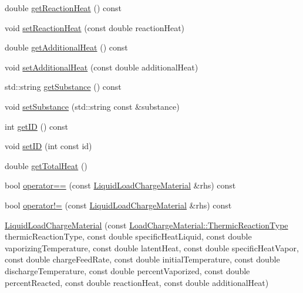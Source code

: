 \begin{DoxyCompactItemize}
\item 
double \hyperlink{class_liquid_load_charge_material_a2f0c26e789e98efd1e8fd0c8741ddd92}{get\+Reaction\+Heat} () const
\item 
void \hyperlink{class_liquid_load_charge_material_a793c7ebc2643b2af0eaf21b9cb788775}{set\+Reaction\+Heat} (const double reaction\+Heat)
\item 
double \hyperlink{class_liquid_load_charge_material_a6b79cd1aec59a7f7119a8abfa9e5859b}{get\+Additional\+Heat} () const
\item 
void \hyperlink{class_liquid_load_charge_material_a557c1f588cfb972ff0c7f748d6c2bd8f}{set\+Additional\+Heat} (const double additional\+Heat)
\item 
std\+::string \hyperlink{class_liquid_load_charge_material_a8f925c04c15ed889ba3fd7c4b628dbff}{get\+Substance} () const
\item 
void \hyperlink{class_liquid_load_charge_material_a85bb43270c6a11a1eaf51f00da16746a}{set\+Substance} (std\+::string const \&substance)
\item 
int \hyperlink{class_liquid_load_charge_material_a92591f91c6ed9fdda10733a439e86389}{get\+ID} () const
\item 
void \hyperlink{class_liquid_load_charge_material_a192946f14996795396354f3e15b9e30b}{set\+ID} (int const id)
\item 
double \hyperlink{class_liquid_load_charge_material_a51a9826325e2c34cd073b8766331d476}{get\+Total\+Heat} ()
\item 
bool \hyperlink{class_liquid_load_charge_material_ad2090d1628f26e46339e9e164b47d3a2}{operator==} (const \hyperlink{class_liquid_load_charge_material}{Liquid\+Load\+Charge\+Material} \&rhs) const
\item 
bool \hyperlink{class_liquid_load_charge_material_aa6ad825ee8ab1c7816ce3bf10260c0bb}{operator!=} (const \hyperlink{class_liquid_load_charge_material}{Liquid\+Load\+Charge\+Material} \&rhs) const
\item 
\hyperlink{class_liquid_load_charge_material_ab6b2ef342701227c60dc380f5a576085}{Liquid\+Load\+Charge\+Material} (const \hyperlink{namespace_load_charge_material_a51d4263e865a5d86236622dd3fe23fd1}{Load\+Charge\+Material\+::\+Thermic\+Reaction\+Type} thermic\+Reaction\+Type, const double specific\+Heat\+Liquid, const double vaporizing\+Temperature, const double latent\+Heat, const double specific\+Heat\+Vapor, const double charge\+Feed\+Rate, const double initial\+Temperature, const double discharge\+Temperature, const double percent\+Vaporized, const double percent\+Reacted, const double reaction\+Heat, const double additional\+Heat)

\end{DoxyCompactItemize}
